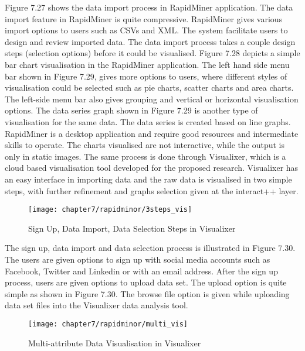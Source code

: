 Figure 7.27 shows the data import process in RapidMiner application. The data import feature in RapidMiner is quite compressive. RapidMiner gives various import options to users such as CSVs and XML. The system facilitate users to design and review imported data. The data import process takes a couple design steps (selection options) before it could be visualised. Figure 7.28 depicts a simple bar chart visualisation in the RapidMiner application. The left hand side menu bar shown in Figure 7.29, gives more options to users, where different styles of visualisation could be selected such as pie charts, scatter charts and area charts. The left-side menu bar also gives grouping and vertical or horizontal visualisation options. The data series graph shown in Figure 7.29 is another type of visualisation for the same data. The data series is created based on line graphs. RapidMiner is a desktop application and require good resources and intermediate skills to operate. The charts visualised are not interactive, while the output is only in static images. The same process is done through Visualixer, which is a cloud based visualisation tool developed for the proposed research. Visualixer has an easy interface in importing data and the raw data is visualised in two simple steps, with further refinement and graphs selection given at the interact++ layer. \\

\begin{figure}
\centering
\texttt{[image: chapter7/rapidminor/3steps\_vis]}
\caption{Sign Up, Data Import, Data Selection Steps in Visualixer}
\end{figure}

The sign up, data import and data selection process is illustrated in Figure 7.30. The users are given options to sign up with social media accounts such as Facebook, Twitter and Linkedin or with an email address. After the sign up process, users are given options to upload data set. The upload option is quite simple as shown in Figure 7.30. The browse file option is given while uploading data set files into the Visualixer data analysis tool.\\

\begin{figure}
\centering
\texttt{[image: chapter7/rapidminor/multi\_vis]}
\caption{Multi-attribute Data Visualisation in Visualixer}
\end{figure}

